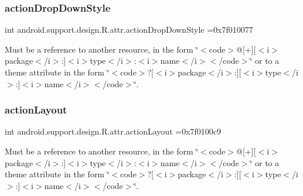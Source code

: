 \subsubsection{\texorpdfstring{action\+Drop\+Down\+Style}{actionDropDownStyle}}
{\footnotesize\ttfamily int android.\+support.\+design.\+R.\+attr.\+action\+Drop\+Down\+Style =0x7f010077\hspace{0.3cm}{\ttfamily [static]}}

Must be a reference to another resource, in the form \char`\"{}$<$code$>$@\mbox{[}+\mbox{]}\mbox{[}$<$i$>$package$<$/i$>$\+:\mbox{]}$<$i$>$type$<$/i$>$\+:$<$i$>$name$<$/i$>$$<$/code$>$\char`\"{} or to a theme attribute in the form \char`\"{}$<$code$>$?\mbox{[}$<$i$>$package$<$/i$>$\+:\mbox{]}\mbox{[}$<$i$>$type$<$/i$>$\+:\mbox{]}$<$i$>$name$<$/i$>$$<$/code$>$\char`\"{}. \mbox{\label{classandroid_1_1support_1_1design_1_1R_1_1attr_a5dd4eba3b7ab21a3ccd2091e9c0ad8e2}} 
\subsubsection{\texorpdfstring{action\+Layout}{actionLayout}}
{\footnotesize\ttfamily int android.\+support.\+design.\+R.\+attr.\+action\+Layout =0x7f0100c9\hspace{0.3cm}{\ttfamily [static]}}

Must be a reference to another resource, in the form \char`\"{}$<$code$>$@\mbox{[}+\mbox{]}\mbox{[}$<$i$>$package$<$/i$>$\+:\mbox{]}$<$i$>$type$<$/i$>$\+:$<$i$>$name$<$/i$>$$<$/code$>$\char`\"{} or to a theme attribute in the form \char`\"{}$<$code$>$?\mbox{[}$<$i$>$package$<$/i$>$\+:\mbox{]}\mbox{[}$<$i$>$type$<$/i$>$\+:\mbox{]}$<$i$>$name$<$/i$>$$<$/code$>$\char`\"{}. \mbox{\label{classandroid_1_1support_1_1design_1_1R_1_1attr_abd2423af4cddf87be76d52972a8648de}} 
